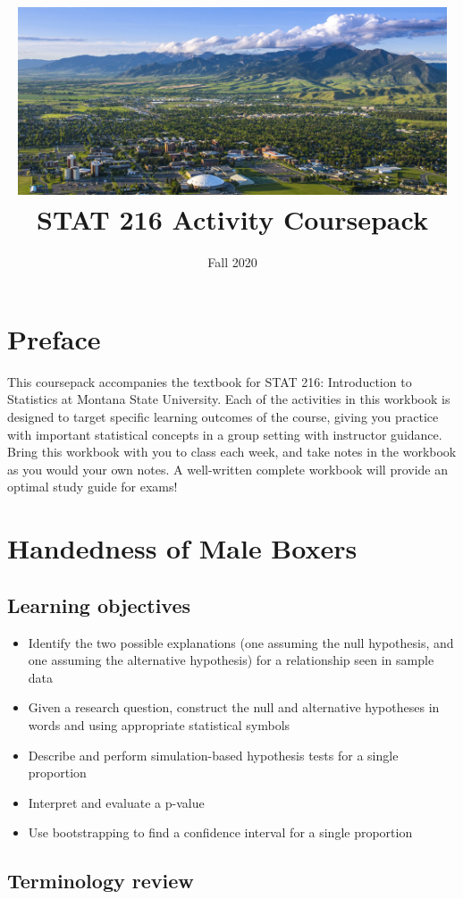 \documentclass[
]{report}
\title{\includegraphics[width=5in,height=\textheight]{images/msu-campus.jpg}
\vspace{1cm}\\
STAT 216 Activity Coursepack}
\subtitle{Fall 2020}
\author{}
\date{\vspace{-2.5em}}
\begin{document}
\maketitle

{
\setcounter{tocdepth}{0}
\tableofcontents
}
\hypertarget{preface}{%
\chapter*{Preface}\label{preface}}

This coursepack accompanies the textbook for STAT 216: Introduction to Statistics at Montana State University. Each of the activities in this workbook is designed to target specific learning outcomes of the course, giving you practice with important statistical concepts in a group setting with instructor guidance. Bring this workbook with you to class each week, and take notes in the workbook as you would your own notes. A well-written complete workbook will provide an optimal study guide for exams!

\hypertarget{handedness-of-male-boxers}{%
\chapter{Handedness of Male Boxers}\label{handedness-of-male-boxers}}

\hypertarget{learning-objectives}{%
\section{Learning objectives}\label{learning-objectives}}

\begin{itemize}
\item
  Identify the two possible explanations (one assuming the null hypothesis, and one assuming the alternative hypothesis) for a relationship seen in sample data
\item
  Given a research question, construct the null and alternative hypotheses
  in words and using appropriate statistical symbols
\item
  Describe and perform simulation-based hypothesis tests for a single proportion
\item
  Interpret and evaluate a p-value
\item
  Use bootstrapping to find a confidence interval for a single proportion
\end{itemize}

\hypertarget{terminology-review}{%
\section{Terminology review}\label{terminology-review}}
\end{document}
